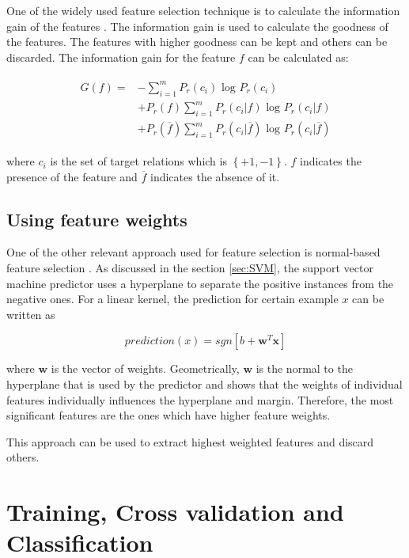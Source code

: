 One of the widely used feature selection technique is to calculate the information gain of the features \cite{yang1997comparative}. The information gain is used to calculate the goodness of the features. The features with higher goodness can be kept and others can be discarded. The information gain for the feature $f$ can be calculated as:

\begin{align}
\begin{aligned}
 G \left( f \right) = & -  \sum^m_{i=1} P_r(c_i) \text{ log } P_r(c_i) \\ 
  & + P_r(f) \sum^m_{i=1} P_r(c_i|f) \text{ log } P_r(c_i|f)\\ 
  & +  P_r(\overline{f}) \sum^m_{i=1} P_r(c_i|\overline{f}) \text{ log } P_r(c_i|\overline{f})  
\end{aligned}  
\end{align}

where $c_i$ is the set of target relations which is $\left\lbrace +1, -1 \right\rbrace$. $f$ indicates the presence of the feature and $\overline{f}$ indicates the absence of it.

\subsection{Using feature weights}\label{subsec:FWR}

One of the other relevant approach used for feature selection is normal-based feature selection \cite{brank2002feature}. As discussed in the section \ref{sec:SVM}, the support vector machine predictor uses a hyperplane to separate the positive instances from the negative ones. For a linear kernel, the prediction for certain example $x$ can be written as 

$$
prediction(x) = sgn \left[ b + \mathbf{w}^T\mathbf{x} \right]
$$

where $\mathbf{w}$ is the vector of weights. Geometrically, $\mathbf{w}$ is the normal to the hyperplane that is used by the predictor and \cite{brank2002feature} shows that the weights of individual features individually influences the hyperplane and margin. Therefore, the most significant features are the ones which have higher feature weights.

This approach can be used to extract highest weighted features and discard others.


\section{Training, Cross validation and Classification}\label{sec:training}

